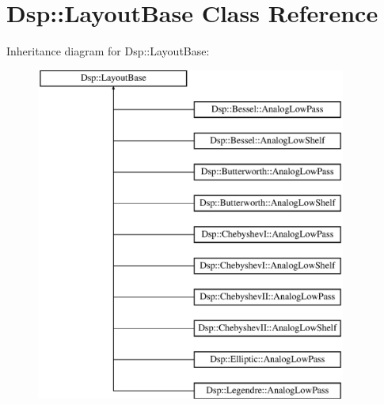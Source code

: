 \hypertarget{classDsp_1_1LayoutBase}{\section{Dsp\-:\-:Layout\-Base Class Reference}
\label{classDsp_1_1LayoutBase}
}
Inheritance diagram for Dsp\-:\-:Layout\-Base\-:\begin{figure}[H]
\begin{center}
\leavevmode
\includegraphics[height=11.000000cm]{classDsp_1_1LayoutBase}
\end{center}
\end{figure}
